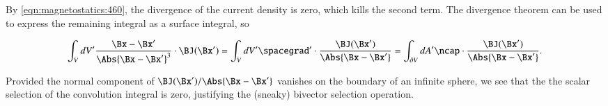 By \cref{eqn:magnetostatics:460}, the divergence of the current density is zero, which kills the second term.
The divergence theorem can be used to express the remaining integral as a surface integral, so

\begin{dmath}\label{eqn:magnetostatics_biotSavart:100}
 \int_V dV' \frac{\Bx - \Bx'}{ \Abs{\Bx - \Bx'}^3 } \cdot \BJ(\Bx')
=  \int_V dV' \spacegrad' \cdot \frac{\BJ(\Bx')}{ \Abs{\Bx - \Bx'} }
=  \int_{\partial V} dA' \ncap \cdot \frac{\BJ(\Bx')}{ \Abs{\Bx - \Bx'} }.
\end{dmath}

Provided the normal component of \( \BJ(\Bx')/\Abs{\Bx - \Bx'} \) vanishes on the boundary of an infinite sphere, we see that the
the scalar selection of the convolution integral is zero, justifying the (sneaky) bivector selection operation.

